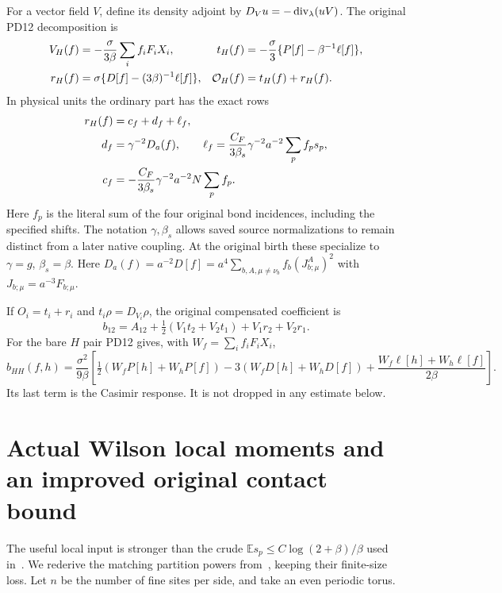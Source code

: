 \documentclass[11pt,letterpaper]{article}
\theoremstyle{plain}
\theoremstyle{remark}\newtheorem{remark}[theorem]{Scope}
\newcommand{\E}{\mathbb E}\newcommand{\R}{\mathbb R}
\begin{document}
For a vector field $V$, define its density adjoint by
$D_Vu=-\operatorname{div}_\lambda(uV)$. The original PD12 decomposition is
\begin{align}
V_H(f)&=-\frac{\sigma}{3\beta}\sum_i f_iF_iX_i,
&t_H(f)&=-\frac{\sigma}{3}\{P[f]-\beta^{-1}\ell[f]\},\notag\\
r_H(f)&=\sigma\{D[f]-(3\beta)^{-1}\ell[f]\},
&\mathcal O_H(f)&=t_H(f)+r_H(f).
\label{eq:oldH}
\end{align}
In physical units the ordinary part has the exact rows
\begin{align}
r_H(f)&=c_f+d_f+\ell_f,\notag\\
d_f&=\gamma^{-2}D_a(f),\qquad
\ell_f=\frac{C_F}{3\beta_s}\gamma^{-2}a^{-2}\sum_p f_ps_p,\notag\\
c_f&=-\frac{C_F}{3\beta_s}\gamma^{-2}a^{-2}N\sum_p f_p.
\label{eq:Casimir}
\end{align}
Here $f_p$ is the literal sum of the four original bond incidences, including the
specified shifts. The notation $\gamma,\beta_s$ allows saved source normalizations
to remain distinct from a later native coupling. At the original birth these
specialize to $\gamma=g$, $\beta_s=\beta$.
Here $D_a(f)=a^{-2}D[f]=a^4\sum_{b,A,\mu\ne\nu_b}f_b(J_{b;\mu}^A)^2$
with $J_{b;\mu}=a^{-3}F_{b;\mu}$.

If $O_i=t_i+r_i$ and $t_i\rho=D_{V_i}\rho$, the original compensated coefficient is
\begin{equation}
b_{12}=A_{12}+\tfrac12(V_1t_2+V_2t_1)+V_1r_2+V_2r_1.
\label{eq:oldb}
\end{equation}
For the bare $H$ pair PD12 gives, with $W_f=\sum_i f_iF_iX_i$,
\begin{equation}
b_{HH}(f,h)=\frac{\sigma^2}{9\beta}
\left[\tfrac12(W_fP[h]+W_hP[f])-3(W_fD[h]+W_hD[f])
+\frac{W_f\ell[h]+W_h\ell[f]}{2\beta}\right].
\label{eq:bareb}
\end{equation}
Its last term is the Casimir response. It is not dropped in any estimate below.

\section{Actual Wilson local moments and an improved original contact bound}
\label{sec:moments}

The useful local input is stronger than the crude
$\E s_p\le C\log(2+\beta)/\beta$ used in~\cite[pp.~21--23]{W}. We rederive the
matching partition powers from~\cite[\S10, pp.~21--23]{W}, keeping their finite-size loss.
Let $n$ be the number of fine sites per side, and take an even periodic torus.
\end{document}
